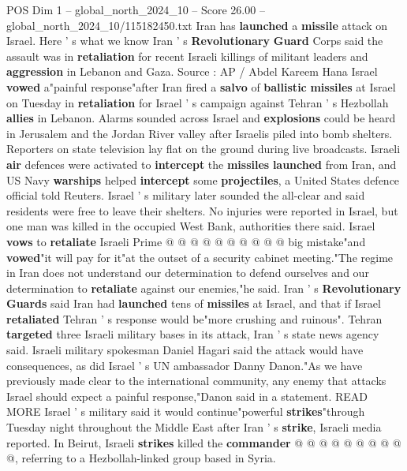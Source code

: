 \begin{textsample}{POS Dim 1 – global\_north\_2024\_10 – Score 26.00 – global\_north\_2024\_10/115182450.txt}  \label{ex:f1_pos_086}
Iran has \textbf{launched} a \textbf{missile} attack on Israel.
Here ' s what we know Iran ' s \textbf{Revolutionary} \textbf{Guard} Corps said the assault was in \textbf{retaliation} for recent Israeli killings of militant leaders and \textbf{aggression} in Lebanon and Gaza.
Source : AP / Abdel Kareem Hana Israel \textbf{vowed} a"painful response"after Iran fired a \textbf{salvo} of \textbf{ballistic} \textbf{missiles} at Israel on Tuesday in \textbf{retaliation} for Israel ' s campaign against Tehran ' s Hezbollah \textbf{allies} in Lebanon.
Alarms sounded across Israel and \textbf{explosions} could be heard in Jerusalem and the Jordan River valley after Israelis piled into bomb shelters.
Reporters on state television lay flat on the ground during live broadcasts.
Israeli \textbf{air} defences were activated to \textbf{intercept} the \textbf{missiles} \textbf{launched} from Iran, and US Navy \textbf{warships} helped \textbf{intercept} some \textbf{projectiles}, a United States defence official told Reuters.
Israel ' s military later sounded the all-clear and said residents were free to leave their shelters.
No injuries were reported in Israel, but one man was killed in the occupied West Bank, authorities there said.
Israel \textbf{vows} to \textbf{retaliate} Israeli Prime @ @ @ @ @ @ @ @ @ @ big mistake"and \textbf{vowed}"it will pay for it"at the outset of a security cabinet meeting."The regime in Iran does not understand our determination to defend ourselves and our determination to \textbf{retaliate} against our enemies,"he said.
Iran ' s \textbf{Revolutionary} \textbf{Guards} said Iran had \textbf{launched} tens of \textbf{missiles} at Israel, and that if Israel \textbf{retaliated} Tehran ' s response would be"more crushing and ruinous".
Tehran \textbf{targeted} three Israeli military bases in its attack, Iran ' s state news agency said.
Israeli military spokesman Daniel Hagari said the attack would have consequences, as did Israel ' s UN ambassador Danny Danon."As we have previously made clear to the international community, any enemy that attacks Israel should expect a painful response,"Danon said in a statement.
READ MORE Israel ' s military said it would continue"powerful \textbf{strikes}"through Tuesday night throughout the Middle East after Iran ' s \textbf{strike}, Israeli media reported.
In Beirut, Israeli \textbf{strikes} killed the \textbf{commander} @ @ @ @ @ @ @ @ @ @, referring to a Hezbollah-linked group based in Syria.

\end{textsample}
